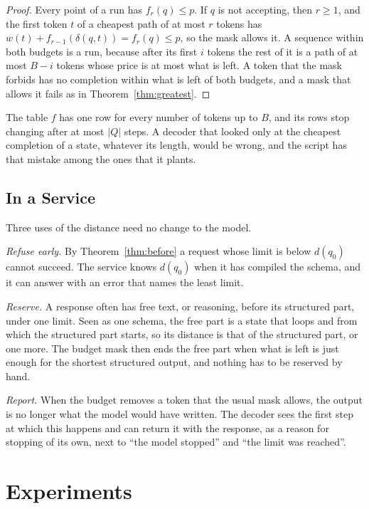 \documentclass[acmsmall,nonacm,screen]{acmart}
\newcommand{\far}{d}
\begin{document}
\begin{proof}
Every point of a run has $f_r(q) \le p$. If $q$ is not accepting, then $r \ge 1$, and the
first token $t$ of a cheapest path of at most $r$ tokens has $w(t) + f_{r-1}(\delta(q, t)) =
f_r(q) \le p$, so the mask allows it. A sequence within both budgets is a run, because after
its first $i$ tokens the rest of it is a path of at most $B - i$ tokens whose price is at
most what is left. A token that the mask forbids has no completion within what is left of
both budgets, and a mask that allows it fails as in Theorem~\ref{thm:greatest}.
\end{proof}

The table $f$ has one row for every number of tokens up to $B$, and its rows stop changing
after at most $|Q|$ steps. A decoder that looked only at the cheapest completion of a state,
whatever its length, would be wrong, and the script has that mistake among the ones that it
plants.

\subsection{In a Service}

Three uses of the distance need no change to the model.

\emph{Refuse early.} By Theorem~\ref{thm:before} a request whose limit is below
$\far(q_0)$ cannot succeed. The service knows $\far(q_0)$ when it has compiled the schema,
and it can answer with an error that names the least limit.

\emph{Reserve.} A response often has free text, or reasoning, before its structured part,
under one limit. Seen as one schema, the free part is a state that loops and from which the
structured part starts, so its distance is that of the structured part, or one more. The budget mask then
ends the free part when what is left is just enough for the shortest structured output, and
nothing has to be reserved by hand.

\emph{Report.} When the budget removes a token that the usual mask allows, the output is no
longer what the model would have written. The decoder sees the first step at which this
happens and can return it with the response, as a reason for stopping of its own, next to
``the model stopped'' and ``the limit was reached''.

\section{Experiments}\label{sec:experiments}
\end{document}

